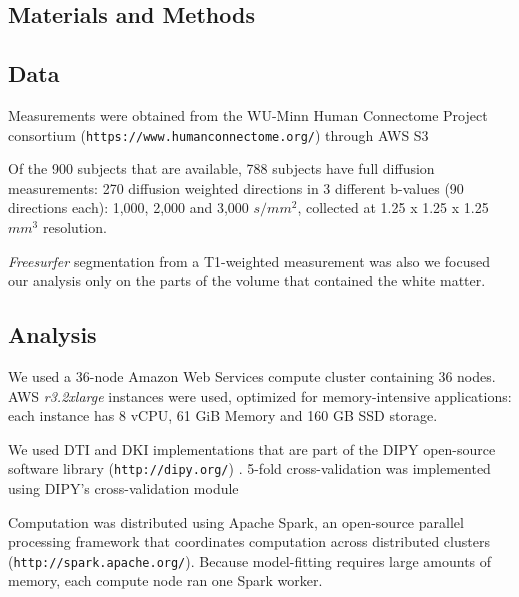 \documentclass[a0, landscape]{a0poster}
\begin{document}
\begin{multicols}{3}
\normalsize
\section*{Materials and Methods}
\vspace{-10mm}
\subsection*{Data}
Measurements were obtained from the WU-Minn Human Connectome Project consortium
(\texttt{https://www.humanconnectome.org/}) through AWS S3

\noindent Of the 900 subjects that are available, 788 subjects have full
diffusion measurements: 270 diffusion weighted directions in 3 different
b-values (90 directions each): 1,000, 2,000 and 3,000 $s/mm^2$, collected at
1.25 x 1.25 x 1.25 $mm^3$ resolution.

\noindent \emph{Freesurfer} segmentation from a T1-weighted measurement was also
we focused our analysis only on the parts of the volume that contained the white
matter.
\vspace{-10mm}


\color{DarkSlateGray}
\subsection*{Analysis}

We used a 36-node Amazon Web Services compute cluster containing 36 nodes. AWS
\emph{r3.2xlarge} instances were used, optimized for memory-intensive
applications: each instance has 8 vCPU, 61 GiB Memory and 160 GB SSD storage.

\noindent We used DTI and DKI implementations that are part of the DIPY
open-source software library (\texttt{http://dipy.org/}) \cite{Garyfallidis2014FrontNeuroinf}. 5-fold cross-validation was implemented using DIPY's cross-validation module \cite{Rokem2015PLoS}

\noindent Computation was distributed using Apache Spark, an open-source
parallel processing framework that coordinates computation across distributed
clusters (\texttt{http://spark.apache.org/}). Because model-fitting requires
large amounts of memory, each compute node ran one Spark worker.


\end{multicols}
\end{document}
